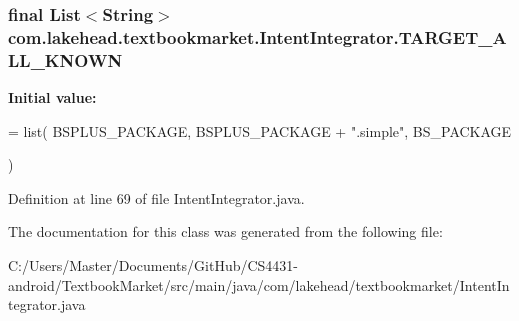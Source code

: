 \hypertarget{classcom_1_1lakehead_1_1textbookmarket_1_1_intent_integrator_a2a587cf4e6af0356aa079475c3fd31ee}{
\subsubsection[{T\-A\-R\-G\-E\-T\-\_\-\-A\-L\-L\-\_\-\-K\-N\-O\-W\-N}]{\setlength{\rightskip}{0pt plus 5cm}final List$<$String$>$ com.\-lakehead.\-textbookmarket.\-Intent\-Integrator.\-T\-A\-R\-G\-E\-T\-\_\-\-A\-L\-L\-\_\-\-K\-N\-O\-W\-N\hspace{0.3cm}{\ttfamily [static]}}}\label{classcom_1_1lakehead_1_1textbookmarket_1_1_intent_integrator_a2a587cf4e6af0356aa079475c3fd31ee}
{\bfseries Initial value\-:}
\begin{DoxyCode}
= list(
            BSPLUS\_PACKAGE,             
            BSPLUS\_PACKAGE + \textcolor{stringliteral}{".simple"}, 
            BS\_PACKAGE                  
            
    )
\end{DoxyCode}


Definition at line 69 of file Intent\-Integrator.\-java.



The documentation for this class was generated from the following file\-:\begin{DoxyCompactItemize}
\item 
C\-:/\-Users/\-Master/\-Documents/\-Git\-Hub/\-C\-S4431-\/android/\-Textbook\-Market/src/main/java/com/lakehead/textbookmarket/Intent\-Integrator.\-java\end{DoxyCompactItemize}
